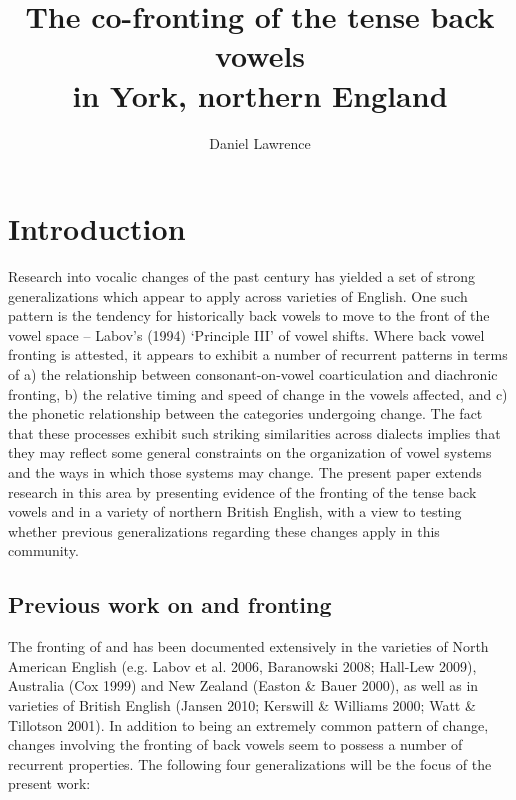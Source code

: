 \documentclass[12pt]{article}
\title{The co-fronting of the tense back vowels\\ in York, northern England}
\author{Daniel Lawrence}
\begin{document}
\maketitle

\section{Introduction}

Research into vocalic changes of the past century has yielded a set of strong generalizations which appear to apply across varieties of English. One such pattern is the tendency for historically back vowels to move to the front of the vowel space -- Labov's (1994) `Principle III' of vowel shifts. Where back vowel fronting is attested, it appears to exhibit a number of recurrent patterns in terms of a) the relationship between consonant-on-vowel coarticulation and diachronic fronting, b) the relative timing and speed of change in the vowels affected, and c) the phonetic relationship between the categories undergoing change. The fact that these processes exhibit such striking similarities across dialects implies that they may reflect some general constraints on the organization of vowel systems and the ways in which those systems may change. The present paper extends research in this area by presenting evidence of the fronting of the tense back vowels  and  in a variety of northern British English, with a view to testing whether previous generalizations regarding these changes apply in this community. 

\subsection{Previous work on  and  fronting}

The fronting of  and  has been documented extensively in the varieties of North American English (e.g. Labov et al. 2006, Baranowski 2008; Hall-Lew 2009), Australia (Cox 1999) and New Zealand (Easton \& Bauer 2000), as well as in varieties of British English (Jansen 2010; Kerswill \& Williams 2000; Watt \& Tillotson 2001). In addition to being an extremely common pattern of change, changes involving the fronting of back vowels seem to possess a number of recurrent properties. The following four generalizations will be the focus of the present work:
\end{document}
